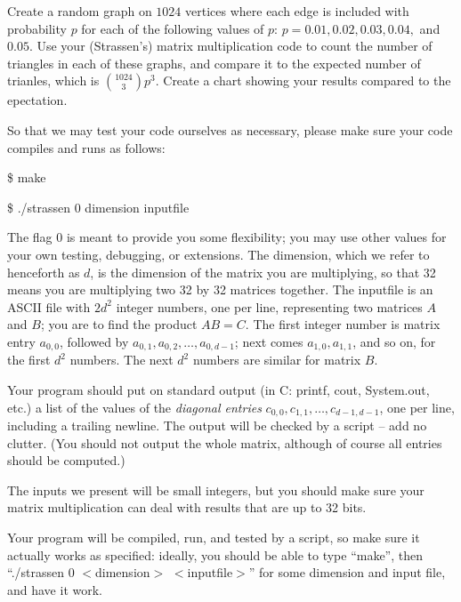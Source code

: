 \documentclass[11pt]{article}
\begin{document}
\begin{enumerate}
Create a random graph on $1024$ vertices where each edge is included with probability $p$ for each of the following values of $p$:  $p = 0.01, 0.02, 0.03, 0.04,$ and $0.05$.  Use your (Strassen's) matrix multiplication code to count the number of triangles in each of these graphs, and compare it to the expected number of trianles, which is ${1024 \choose 3} p^3$.  Create a chart showing your results compared to the epectation.  

\end{enumerate}


So that we may test your code ourselves as necessary, please make sure
your code compiles and runs as follows:

\noindent \$ make

\smallskip

\noindent \$ ./strassen 0 dimension inputfile 

The flag 0 is meant to provide you some flexibility; you may use other
values for your own testing, debugging, or extensions.  The dimension,
which we refer to henceforth as $d$, is the dimension of the matrix
you are multiplying, so that 32 means you are multiplying two 32 by 32
matrices together.  The inputfile is an ASCII file with $2d^2$ integer
numbers, one per line, representing two matrices $A$ and $B$; you are
to find the product $AB = C$.  The first integer number is matrix entry
$a_{0,0}$, followed by $a_{0,1},a_{0,2},\ldots,a_{0,d-1}$; next comes
$a_{1,0},a_{1,1}$, and so on, for the first $d^2$ numbers.  The next
$d^2$ numbers are similar for matrix $B$.

Your program should put on standard output (in C: printf, cout, System.out,
etc.) a list of the values of the {\em diagonal entries}
$c_{0,0},c_{1,1},\ldots,c_{d-1,d-1}$, one per line, including a
trailing newline.  The output will be checked by a script -- add no
clutter.  (You should not output the whole matrix, although of course
all entries should be computed.)

The inputs we present will be small integers, but you should make sure
your matrix multiplication can deal with results that are up to 32 bits.

Your program will be compiled, run, and tested by a script, so make sure
it actually works as specified: ideally, you should be able to 
type ``make'', then ``./strassen 0 $<$dimension$>$
$<$inputfile$>$'' for some dimension and input file, and have it work.
\end{document}

